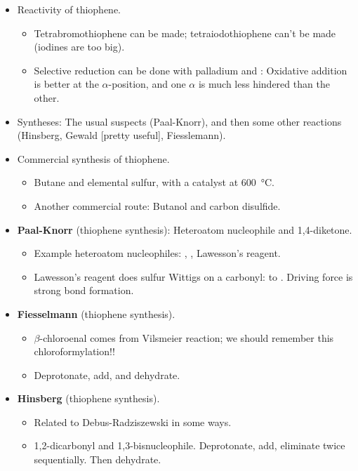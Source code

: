 \documentclass[../notes.tex]{subfiles}
\begin{document}
\begin{itemize}
    \item Reactivity of thiophene.
    \begin{itemize}
        \item Tetrabromothiophene can be made; tetraiodothiophene can't be made (iodines are too big).
        \item Selective reduction can be done with palladium and : Oxidative addition is better at the $\alpha$-position, and one $\alpha$ is much less hindered than the other.
    \end{itemize}
    \item Syntheses: The usual suspects (Paal-Knorr), and then some other reactions (Hinsberg, Gewald [pretty useful], Fiesslemann).
    \item Commercial synthesis of thiophene.
    \begin{itemize}
        \item Butane and elemental sulfur, with a catalyst at \SI{600}{\celsius}.
        \item Another commercial route: Butanol and carbon disulfide.
    \end{itemize}
    \pagebreak
    \item \textbf{Paal-Knorr} (thiophene synthesis): Heteroatom nucleophile and 1,4-diketone.
    \begin{itemize}
        \item Example heteroatom nucleophiles: , , Lawesson's reagent.
        \item Lawesson's reagent does sulfur Wittigs on a carbonyl:  to . Driving force is strong  bond formation.
    \end{itemize}
    \item \textbf{Fiesselmann} (thiophene synthesis).
    \begin{itemize}
        \item $\beta$-chloroenal comes from Vilsmeier reaction; we should remember this chloroformylation!!
        \item Deprotonate, add, and dehydrate.
    \end{itemize}
    \item \textbf{Hinsberg} (thiophene synthesis).
    \begin{itemize}
        \item Related to Debus-Radziszewski in some ways.
        \item 1,2-dicarbonyl and 1,3-bisnucleophile. Deprotonate, add, eliminate twice sequentially. Then dehydrate.

\end{itemize}
\end{itemize}
\end{document}
